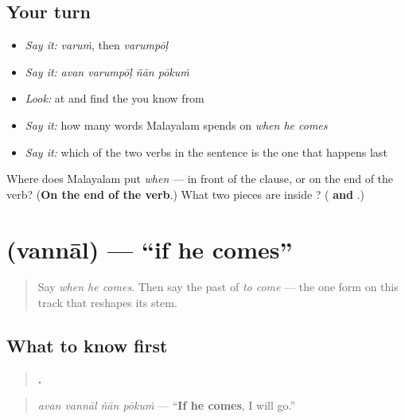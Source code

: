\subsection*{Your turn}
\begin{itemize}
\raggedright
  \item \emph{Say it:} \emph{varuṁ}, then \emph{varumpōḷ}
  \item \emph{Say it:} \emph{avan varumpōḷ ñān pōkuṁ}
  \item \emph{Look:} at \textbf{} and find the \textbf{} you know from \textbf{}
  \item \emph{Say it:} how many words Malayalam spends on \emph{when he comes}
  \item \emph{Say it:} which of the two verbs in the sentence is the one that happens last
\end{itemize}

\begin{tcolorbox}[breakable,colback=teal!4,colframe=teal!35!black,title={Before you move on}]
Where does Malayalam put \emph{when} — in front of the clause, or on the end of the verb? (\textbf{On the end of the verb}.) What two pieces are inside ? (\textbf{ and }.)
\end{tcolorbox}
\section[\texorpdfstring{\ml{വന്നാൽ} (vannāl)}{വന്നാൽ (vannāl)}]{ (vannāl) — \textquotedblleft{}if he comes\textquotedblright{}}

\label{lesson:ML-C75-aal}



\begin{quote}
Say \emph{when he comes}. Then say the past of \emph{to come} — the one form on this track that reshapes its stem.
\end{quote}

\subsection*{What to know first}
\begin{quote}
\textbf{   .}
\end{quote}

\begin{quote}
\emph{avan vannāl ñān pōkuṁ} — \textquotedblleft{}\textbf{If he comes}, I will go.\textquotedblright{}
\end{quote}

